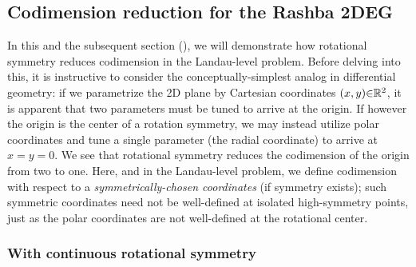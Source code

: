 \documentclass[aps, prb, showpacs, twocolumn, notitlepage, superscriptaddress]{revtex4-1}
\begin{document}
\subsection{Codimension reduction for the Rashba 2DEG}\label{sec:singleparameterrashba}


In this and the subsequent section (), we will demonstrate how rotational symmetry reduces codimension in the Landau-level problem. Before delving into this, it is instructive to consider the conceptually-simplest analog in differential geometry: if we parametrize the 2D plane by Cartesian coordinates $(x,y){\in}\mathbb{R}^2$, it is apparent that two parameters must be tuned to arrive at the origin. If however the origin is the center of a rotation symmetry, we may instead utilize polar coordinates and tune a single parameter (the radial coordinate) to arrive at $x{=}y{=}0$. We see that rotational symmetry reduces the codimension of the origin from two to one. Here, and in the  Landau-level problem, we define codimension with respect to a \textit{symmetrically-chosen coordinates} (if symmetry exists); such symmetric coordinates need not be well-defined at isolated high-symmetry points, just as the polar coordinates are not well-defined at the rotational center.


\subsubsection{With continuous rotational symmetry}\label{sec:ctsrot}

\end{document}
